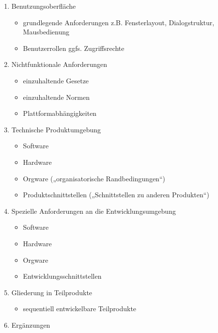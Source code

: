 \documentclass{lehramt-informatik-haupt}
\begin{document}
\begin{enumerate}
\item Benutzungsoberfläche

\begin{itemize}
\item grundlegende Anforderungen z.B. Fensterlayout, Dialogstruktur, Mausbedienung
\item Benutzerrollen ggfs. Zugriffsrechte
\end{itemize}

\item Nichtfunktionale Anforderungen

\begin{itemize}
\item einzuhaltende Gesetze
\item einzuhaltende Normen
\item Plattformabhängigkeiten
\end{itemize}

\item Technische Produktumgebung

\begin{itemize}
\item Software
\item Hardware
\item Orgware („organisatorische Randbedingungen“)
\item Produktschnittstellen („Schnittstellen zu anderen Produkten“)
\end{itemize}

\item Spezielle Anforderungen an die Entwicklungsumgebung

\begin{itemize}
\item Software
\item Hardware
\item Orgware
\item Entwicklungsschnittstellen
\end{itemize}

\item Gliederung in Teilprodukte

\begin{itemize}
\item sequentiell entwickelbare Teilprodukte
\end{itemize}

\item Ergänzungen
\end{enumerate}

%
\end{document}
